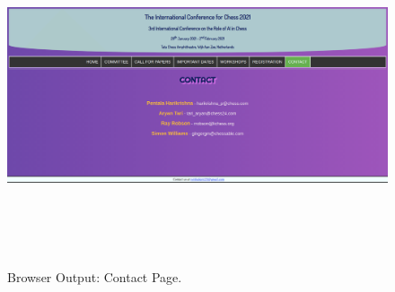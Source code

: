 \documentclass[12pt, a4]{article}
\begin{document}
\newpage
\subsection*{}
\begin{figure}[h]
\centering
\caption{Browser Output: Contact Page.}
\includegraphics[height=10cm, width=18cm, keepaspectratio]{Output/Contact.png}
\end{figure}

\newpage
\end{document}
